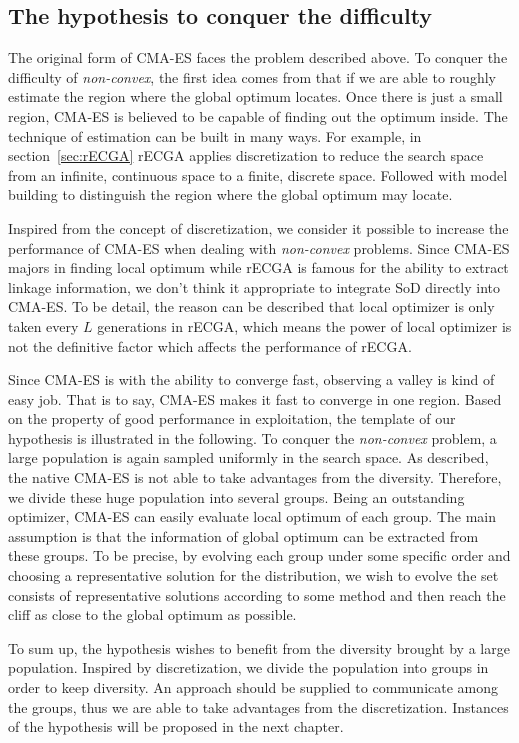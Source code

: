 \subsection{The hypothesis to conquer the
                    difficulty}

The original form of CMA-ES faces the problem
described above.  To conquer the difficulty of
\emph{non-convex}, the first idea comes from that if
we are able to roughly estimate the region where the
global optimum locates.  Once there is just a small
region, CMA-ES is believed to be capable of finding
out the optimum inside.  The technique of estimation
can be built in many ways.  For example, in
section~\ref{sec:rECGA} rECGA applies discretization
to reduce the search space from an infinite,
continuous space to a finite, discrete space.
Followed with model building to distinguish the
region where the global optimum may locate.

Inspired from the concept of discretization, we
consider it possible to increase the performance of
CMA-ES when dealing with \emph{non-convex} problems.
Since CMA-ES majors in finding local optimum while
rECGA is famous for the ability to extract linkage
information, we don't think it appropriate to
integrate SoD directly into CMA-ES.  To be detail,
the reason can be described that local optimizer is
only taken every $L$ generations in rECGA, which
means the power of local optimizer is not the
definitive factor which affects the performance of
rECGA.

Since CMA-ES is with the ability to converge fast,
observing a valley is kind of easy job.  That is to
say, CMA-ES makes it fast to converge in one region.
Based on the property of good performance in
exploitation, the template of our hypothesis is
illustrated in the following.  To conquer the
\emph{non-convex} problem, a large population is
again sampled uniformly in the search space.  As
described, the native CMA-ES is not able to take
advantages from the diversity.  Therefore, we divide
these huge population into several groups.  Being an
outstanding optimizer, CMA-ES can easily evaluate
local optimum of each group.  The main assumption is
that the information of global optimum can be
extracted from these groups.  To be precise, by
evolving each group under some specific order and
choosing a representative solution for the
distribution, we wish to evolve the set consists of
representative solutions according to some method
and then reach the cliff as close to the global
optimum as possible.

To sum up, the hypothesis wishes to benefit from the
diversity brought by a large population.  Inspired
by discretization, we divide the population into
groups in order to keep diversity.  An approach
should be supplied to communicate among the groups,
thus we are able to take advantages from the
discretization. Instances of the hypothesis will be
proposed in the next chapter.  
